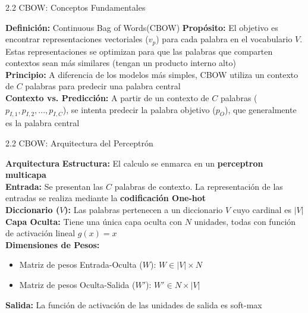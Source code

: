 \documentclass{beamer}
\begin{document}
	
\begin{frame}[fragile]{2.2 CBOW: Conceptos Fundamentales}
	\begin{block}{\textbf{Definición:} Continuous Bag of Words(CBOW)}
		\justifying
		\vspace{0.1cm}
		\textbf{Propósito:} El objetivo es encontrar representaciones vectoriales ($v_p$) para cada palabra en el vocabulario $V$. Estas representaciones se optimizan para que las palabras que comparten contextos sean más similares (tengan un producto interno alto)\\
		\vspace{0.1cm}
		\textbf{Principio:} A diferencia de los modelos más simples, CBOW utiliza un contexto de $C$ palabras para predecir una palabra central\\
		\vspace{0.1cm}
		\textbf{Contexto vs. Predicción:}  A partir de un contexto de $C$ palabras ($p_{I,1}, p_{I,2}, ..., p_{I,C}$), se intenta predecir la palabra objetivo ($p_O$), que generalmente es la palabra central
	\end{block}
	
\end{frame}

\begin{frame}[fragile]{2.2 CBOW: Arquitectura del Perceptrón}
	\begin{block}{\textbf{Arquitectura}}
		\justifying
		\vspace{0.1cm}
		\textbf{Estructura:} El calculo se enmarca en un \textbf{perceptron multicapa}\\
		\vspace{0.1cm}
		\textbf{Entrada:} Se presentan las $C$ palabras de contexto. La representación de las entradas se realiza mediante la \textbf{codificación One-hot}\\
		\vspace{0.1cm}
		\textbf{Diccionario ($V$):} Las palabras pertenecen a un diccionario $V$ cuyo cardinal es $|V|$ \\
		\vspace{0.1cm}
		\textbf{Capa Oculta:} Tiene una única capa oculta con $N$ unidades, todas con función de activación lineal $g(x) = x$ \\
		\vspace{0.1cm}
		\textbf{Dimensiones de Pesos:} 						\\
		\begin{itemize}
			\item Matriz de pesos Entrada-Oculta ($W$): $W \in |V| \times N$\\
			\item Matriz de pesos Oculta-Salida ($W'$): $W' \in N \times |V|$
		\end{itemize}
		\vspace{0.1cm}
		\textbf{Salida:} La función de activación de las unidades de salida es soft-max 
	\end{block}
	
\end{frame}
	
\end{document}
